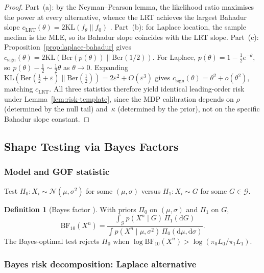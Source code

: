 \documentclass[11pt]{article}
\newcommand{\KL}{\mathrm{KL}}
\newcommand{\rhotail}{\rho}  %
\newcommand{\1}{\mathbf{1}}
\theoremstyle{plain}
\theoremstyle{definition}
\newtheorem{definition}[theorem]{Definition}
\theoremstyle{remark}
\begin{document}
\begin{proof}
Part~(a): by the Neyman--Pearson lemma, the likelihood ratio maximises the power at every alternative, whence the LRT achieves the largest Bahadur slope $c_{\mathrm{LRT}}(\theta)=2\KL(f_\theta\|f_0)$ \citep{Bahadur1960}.
Part~(b): for Laplace location, the sample median is the MLE, so its Bahadur slope coincides with the LRT slope.
Part~(c): Proposition~\ref{prop:laplace-bahadur} gives $c_{\mathrm{sign}}(\theta)=2\KL(\mathrm{Ber}(p(\theta))\|\mathrm{Ber}(1/2))$. For Laplace, $p(\theta)=1-\frac12 e^{-\theta}$, so $p(\theta)-\frac12\sim\frac12\theta$ as $\theta\to 0$. Expanding $\KL(\mathrm{Ber}(\frac12+\varepsilon)\|\mathrm{Ber}(\frac12))=2\varepsilon^2+O(\varepsilon^3)$ gives $c_{\mathrm{sign}}(\theta)=\theta^2+o(\theta^2)$, matching $c_{\mathrm{LRT}}$.
All three statistics therefore yield identical leading-order risk under Lemma~\ref{lem:risk-template}, since the MDP calibration depends on $\rhotail$ (determined by the null tail) and~$\kappa$ (determined by the prior), not on the specific Bahadur slope constant.
\end{proof}


\subsection{Shape Testing via Bayes Factors}\label{subsec:shape}

\subsubsection{Model and GOF statistic}

Test $H_0: X_i \sim \mathcal{N}(\mu,\sigma^2)$ for some $(\mu,\sigma)$ versus $H_1: X_i \sim G$ for some $G\in\mathcal{G}$.

\begin{definition}[Bayes factor {\citep{JeffreysBook, Kass1995}}]\label{def:bayes-factor}
With priors $\Pi_0$ on $(\mu,\sigma)$ and $\Pi_1$ on $G$,
\begin{equation}\label{eq:bayes-factor}
\mathrm{BF}_{10}(X^n)
=
\frac{\int_{\mathcal{G}} p(X^n\mid G)\,\Pi_1(\mathrm{d}G)}
     {\int p(X^n\mid\mu,\sigma^2)\,\Pi_0(\mathrm{d}\mu,\mathrm{d}\sigma)}.
\end{equation}
The Bayes-optimal test rejects $H_0$ when $\log \mathrm{BF}_{10}(X^n) > \log(\pi_0 L_0/\pi_1 L_1)$.
\end{definition}

\subsubsection{Bayes risk decomposition: Laplace alternative}
\end{document}

